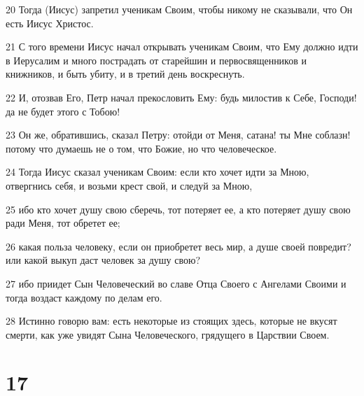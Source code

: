 \par 20 Тогда (Иисус) запретил ученикам Своим, чтобы никому не сказывали, что Он есть Иисус Христос.
\par 21 С того времени Иисус начал открывать ученикам Своим, что Ему должно идти в Иерусалим и много пострадать от старейшин и первосвященников и книжников, и быть убиту, и в третий день воскреснуть.
\par 22 И, отозвав Его, Петр начал прекословить Ему: будь милостив к Себе, Господи! да не будет этого с Тобою!
\par 23 Он же, обратившись, сказал Петру: отойди от Меня, сатана! ты Мне соблазн! потому что думаешь не о том, что Божие, но что человеческое.
\par 24 Тогда Иисус сказал ученикам Своим: если кто хочет идти за Мною, отвергнись себя, и возьми крест свой, и следуй за Мною,
\par 25 ибо кто хочет душу свою сберечь, тот потеряет ее, а кто потеряет душу свою ради Меня, тот обретет ее;
\par 26 какая польза человеку, если он приобретет весь мир, а душе своей повредит? или какой выкуп даст человек за душу свою?
\par 27 ибо приидет Сын Человеческий во славе Отца Своего с Ангелами Своими и тогда воздаст каждому по делам его.
\par 28 Истинно говорю вам: есть некоторые из стоящих здесь, которые не вкусят смерти, как уже увидят Сына Человеческого, грядущего в Царствии Своем.

\chapter{17}

